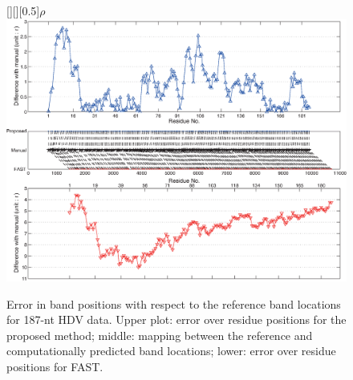 \documentclass[letter]{bioinfo}
\begin{document}
\begin{figure}
\centering
	[][][0.5]{$\rho$}
\includegraphics[width=\linewidth]{figures/result_hdv_result_detail2}
\caption{Error in band positions with respect to the reference band locations for 187-nt HDV data. Upper plot: error over residue positions for the proposed method; middle: mapping between the reference and computationally predicted band locations; lower: error over residue positions for FAST.}
\label{f:hdv-result-detail}
\end{figure}



\onecolumn

\end{document}
